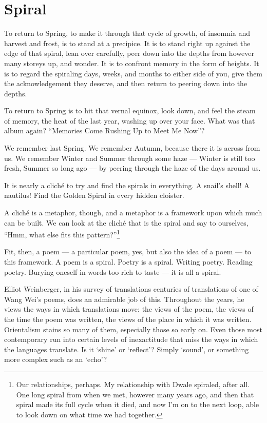 \section*{Spiral}

To return to Spring, to make it through that cycle of growth, of insomnia and harvest and frost, is to stand at a precipice. It is to stand right up against the edge of that spiral, lean over carefully, peer down into the depths from however many storeys up, and wonder. It is to confront memory in the form of heights. It is to regard the spiraling days, weeks, and months to either side of you, give them the acknowledgement they deserve, and then return to peering down into the depths.

To return to Spring is to hit that vernal equinox, look down, and feel the steam of memory, the heat of the last year, washing up over your face. What was that album again? ``Memories Come Rushing Up to Meet Me Now''?

We remember last Spring. We remember Autumn, because there it is across from us. We remember Winter and Summer through some haze --- Winter is still too fresh, Summer so long ago --- by peering through the haze of the days around us.

It is nearly a cliché to try and find the spirals in everything. A snail's shell! A nautilus! Find the Golden Spiral in every hidden cloister.

A cliché is a metaphor, though, and a metaphor is a framework upon which much can be built. We can look at the cliché that is the spiral and say to ourselves, ``Hmm, what else fits this pattern?''\footnote{Our relationships, perhaps. My relationship with Dwale spiraled, after all. One long spiral from when we met, however many years ago, and then that spiral made its full cycle when it died, and now I'm on to the next loop, able to look down on what time we had together.}

Fit, then, a poem --- a particular poem, yes, but also the idea of a poem --- to this framework. A poem is a spiral. Poetry is a spiral. Writing poetry. Reading poetry. Burying oneself in words too rich to taste --- it is all a spiral.

Elliot Weinberger, in his survey of translations centuries of translations of one of Wang Wei's poems, does an admirable job of this. Throughout the years, he views the ways in which translations move: the views of the poem, the views of the time the poem was written, the views of the place in which it was written. Orientalism stains so many of them, especially those so early on. Even those most contemporary run into certain levels of inexactitude that miss the ways in which the languages translate. Is it `shine' or `reflect'? Simply `sound', or something more complex such as an `echo'?

